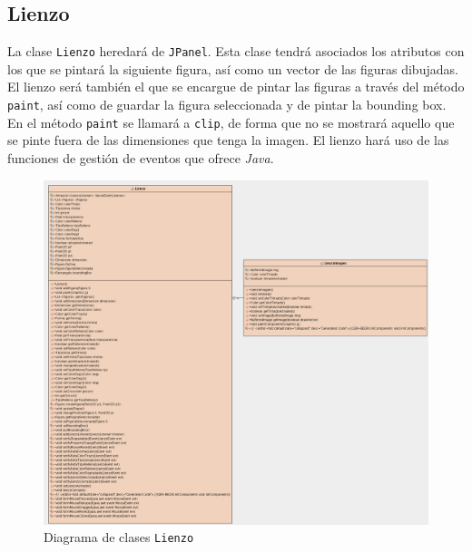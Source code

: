 \subsection{Lienzo}
La clase \texttt{Lienzo} heredará de \texttt{JPanel}. Esta clase tendrá asociados los atributos con los que se pintará la siguiente figura, así como un vector de las figuras dibujadas. El lienzo será también el que se encargue de pintar las figuras a través del método \texttt{paint}, así como de guardar la figura seleccionada y de pintar la bounding box.  
\vskip0.3cm
En el método \texttt{paint} se llamará a \texttt{clip}, de forma que no se mostrará aquello que se pinte fuera de las dimensiones que tenga la imagen.
\vskip0.3cm
El lienzo hará uso de las funciones de gestión de eventos que ofrece \textit{Java}.
\vskip0.3cm
\begin{figure}
 \centering
  \includegraphics[width=1\textwidth]{diagramas/lienzo.png}
 \caption{Diagrama de clases \texttt{Lienzo}}
 \label{diseño}
 \end{figure}
